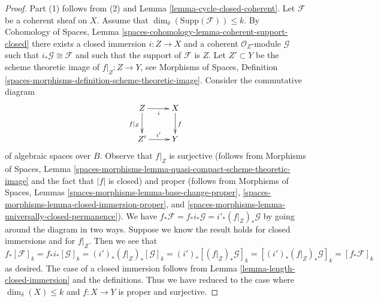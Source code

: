\documentclass[10pt,a4paper]{amsart}
\theoremstyle{plain}
\theoremstyle{definition}
\theoremstyle{remark}
\numberwithin{equation}{subsection}
\begin{document}
\begin{proof}
Part (1) follows from (2) and Lemma \ref{lemma-cycle-closed-coherent}.
Let $\mathcal{F}$ be a coherent sheaf on $X$.
Assume that $\dim_\delta(\text{Supp}(\mathcal{F})) \leq k$.
By Cohomology of Spaces, Lemma
\ref{spaces-cohomology-lemma-coherent-support-closed}
there exists a closed immersion $i : Z \to X$ and a coherent
$\mathcal{O}_Z$-module $\mathcal{G}$ such that
$i_*\mathcal{G} \cong \mathcal{F}$ and such that the support
of $\mathcal{F}$ is $Z$. Let $Z' \subset Y$ be the scheme theoretic image
of $f|_Z : Z \to Y$, see Morphisms of Spaces, Definition
\ref{spaces-morphisms-definition-scheme-theoretic-image}.
Consider the commutative diagram
$$
\xymatrix{
Z \ar[r]_i \ar[d]_{f|_Z} &
X \ar[d]^f \\
Z' \ar[r]^{i'} & Y
}
$$
of algebraic spaces over $B$. Observe that $f|_Z$ is surjective
(follows from Morphisms of Spaces, Lemma
\ref{spaces-morphisms-lemma-quasi-compact-scheme-theoretic-image}
and the fact that $|f|$ is closed) and proper
(follows from Morphisms of Spaces, Lemmas
\ref{spaces-morphisms-lemma-base-change-proper},
\ref{spaces-morphisms-lemma-closed-immersion-proper}, and
\ref{spaces-morphisms-lemma-universally-closed-permanence}).
We have $f_*\mathcal{F} = f_*i_*\mathcal{G} = i'_*(f|_Z)_*\mathcal{G}$
by going around the diagram in two ways. Suppose we know the result holds
for closed immersions and for $f|_Z$. Then we see that
$$
f_*[\mathcal{F}]_k = f_*i_*[\mathcal{G}]_k
= (i')_*(f|_Z)_*[\mathcal{G}]_k =
(i')_*[(f|_Z)_*\mathcal{G}]_k =
[(i')_*(f|_Z)_*\mathcal{G}]_k = [f_*\mathcal{F}]_k
$$
as desired. The case of a closed immersion follows from
Lemma \ref{lemma-length-closed-immersion} and the definitions.
Thus we have reduced to the case where
$\dim_\delta(X) \leq k$ and $f : X \to Y$ is proper and surjective.


\end{proof}
\end{document}

